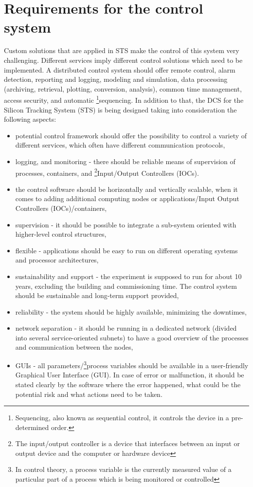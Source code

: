 \section{Requirements for the control system}
\label{sys:req}
Custom solutions that are applied in \gls{STS} make the control of this system very challenging. Different services imply different control solutions which need to be implemented.
A distributed control system should offer remote control, alarm detection, reporting and logging, modeling and simulation, data processing (archiving, retrieval, plotting, conversion, analysis), common time management, access security, and automatic \footnote{Sequencing, also known as sequential control, it controls the device in a pre-determined order.}{sequencing}.
In addition to that, the \gls{DCS} for the Silicon Tracking System (\gls{STS}) is being designed taking into consideration the following aspects:

 
 \begin{itemize}
    \item potential control framework should offer the possibility to control a variety of different services, which often have different communication protocols,
    \item logging, and monitoring - there should be reliable means of supervision of processes, containers, and \footnote{The input/output controller is a device that interfaces between an input or output device and the computer or hardware device}{Input/Output Controllers} (\glspl{IOC}).
    \item the control software should be horizontally and vertically scalable, when it comes to adding additional computing nodes or applications/Input Output Controllers (\glspl{IOC})/containers,
    \item supervision - it should be possible to integrate a sub-system oriented with higher-level control structures,
     \item flexible - applications should be easy to run on different operating systems and processor architectures,
     \item sustainability and support - the experiment is supposed to run for about 10 years, excluding the building and commissioning time. The control system should be sustainable and long-term support provided,
     \item reliability - the system should be highly available, minimizing the downtimes,
     \item network separation - it should be running in a dedicated network (divided into several service-oriented subnets) to have a good overview of the processes and communication between the nodes,
     \item \glspl{GUI} - all parameters/\footnote{In control theory, a process variable is the currently measured value of a particular part of a process which is being monitored or controlled}{process variables} should be available in a user-friendly Graphical User Interface (\gls{GUI}). In case of error or malfunction, it should be stated clearly by the software where the error happened, what could be the potential risk and what actions need to be taken.

 \end{itemize}
\newpage

